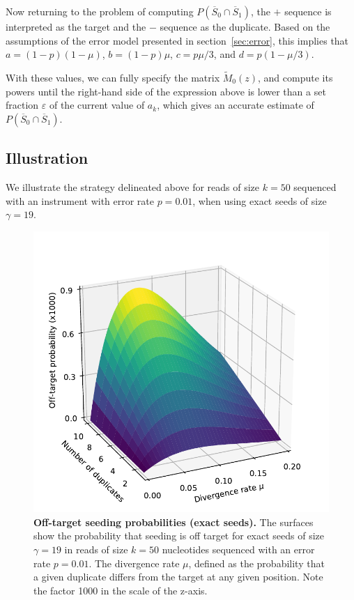 \documentclass{article}
\begin{document}
Now returning to the problem of computing $P(\overline{S}_0 \cap
\overline{S}_1)$, the $+$ sequence is interpreted as the target and the
$-$ sequence as the duplicate. Based on the assumptions of the error model
presented in section~\ref{sec:error}, this implies that $a =
(1-p)(1-\mu)$, $b = (1-p)\mu$, $c = p\mu/3$, and $d = p(1-\mu/3)$.

With these values, we can fully specify the matrix $\tilde{M}_0(z)$, and
compute its powers until the right-hand side of the expression above is
lower than a set fraction $\varepsilon$ of the current value of $a_k$,
which gives an accurate estimate of $P(\overline{S}_0 \cap
\overline{S}_1)$.


\subsection{Illustration}
\label{sec:illdual}

We illustrate the strategy delineated above for reads of size $k=50$
sequenced with an instrument with error rate $p=0.01$, when using exact
seeds of size $\gamma=19$.

\begin{figure}[h]
\centering
\includegraphics[scale=0.65]{curves_exact.pdf}
\caption{\textbf{Off-target seeding probabilities (exact seeds).} The
surfaces show the probability that seeding is off target for exact seeds
of size $\gamma=19$ in reads of size $k=50$ nucleotides sequenced with an
error rate $p=0.01$. The divergence rate $\mu$, defined as the probability
that a given duplicate differs from the target at any given position. Note
the factor 1000 in the scale of the z-axis.} \label{fig:curves_exact}
\end{figure}
\end{document}
